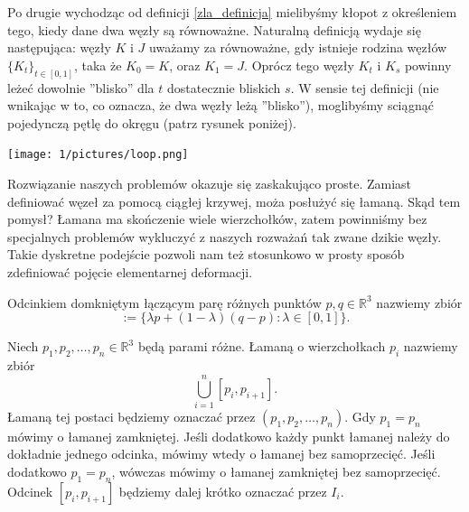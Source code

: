 Po drugie wychodząc od definicji \ref{zla_definicja} mielibyśmy kłopot z określeniem tego, kiedy dane dwa węzły są równoważne. Naturalną definicją wydaje się
następująca: węzły $K$ i $J$ uważamy za równoważne, gdy istnieje rodzina węzłów $\lbrace K_t\rbrace_{t\in[0,1]}$, taka że $K_0 = K$, oraz $K_1 = J$. Oprócz tego 
węzły $K_t$ i $K_s$ powinny leżeć dowolnie ''blisko'' dla $t$ dostatecznie bliskich $s$. W sensie tej definicji (nie wnikając w to, co oznacza,
że dwa węzły leżą ''blisko''), moglibyśmy sciągnąć pojedynczą pętlę do okręgu (patrz rysunek poniżej). 

\begin{minipage}{0.3\textwidth}
	\begin{center}

	\texttt{[image: 1/pictures/loop.png]}
	\end{center}
	\end{minipage}

Rozwiązanie naszych problemów okazuje się zaskakująco proste. Zamiast definiować węzeł za pomocą ciągłej krzywej, moża posłużyć się łamaną. Skąd tem pomysł? Łamana ma skończenie wiele
wierzchołków, zatem powinniśmy bez specjalnych problemów wykluczyć z naszych rozważań tak zwane dzikie węzły. Takie dyskretne podejście pozwoli nam też stosunkowo w prosty sposób zdefiniować
pojęcie elementarnej deformacji.



\begin{definicja}
 Odcinkiem domkniętym łączącym parę różnych punktów $p,q\in\mathbb{R}^3$ nazwiemy zbiór 
 \begin{displaymath}
  [p,q] := \lbrace \lambda p + (1-\lambda)(q-p): \lambda\in[0,1]\rbrace.
 \end{displaymath}
\end{definicja}

\begin{definicja}
 Niech $p_1, p_2, \ldots, p_n\in\mathbb{R}^3$ będą parami różne. Łamaną o wierzchołkach $p_i$ nazwiemy zbiór 
 \begin{displaymath}
  \bigcup_{i=1}^n [p_i, p_{i+1}].
 \end{displaymath}
 Łamaną tej postaci będziemy oznaczać przez $(p_1, p_2, \ldots, p_n)$. Gdy $p_1 = p_n$ mówimy o łamanej zamkniętej.
 Jeśli dodatkowo każdy punkt łamanej należy do dokładnie jednego odcinka, mówimy wtedy o łamanej bez samoprzecięć. Jeśli dodatkowo $p_1 = p_n$, wówczas mówimy o łamanej
 zamkniętej bez samoprzecięć. Odcinek $[p_i, p_{i+1}]$ będziemy dalej krótko oznaczać przez $I_i$.
\end{definicja}

